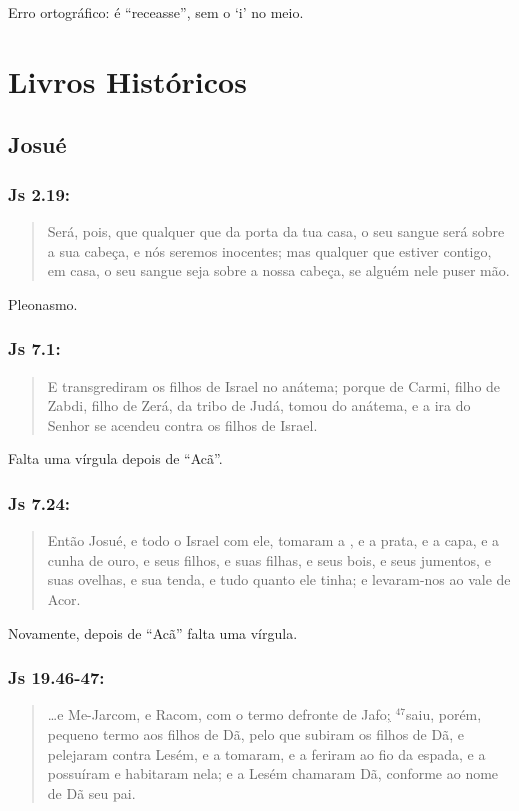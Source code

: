 Erro ortográfico: é ``receasse'', sem o `i' no meio.

\chapter{Livros Históricos}

\section{Josué}
\subsection*{Js 2.19:} 
\begin{quote}
    \small
Será, pois, que qualquer que  da porta da tua casa, o seu sangue será sobre a sua cabeça, e nós seremos inocentes; mas qualquer que estiver contigo, em casa, o seu sangue seja sobre a nossa cabeça, se alguém nele puser mão.
\end{quote}

Pleonasmo.

\subsection*{Js 7.1:} 
\begin{quote}
    \small
E transgrediram os filhos de Israel no anátema; porque  de Carmi, filho de Zabdi, filho de Zerá, da tribo de Judá, tomou do anátema, e a ira do Senhor se acendeu contra os filhos de Israel.
\end{quote}

Falta uma vírgula depois de ``Acã''.

\subsection*{Js 7.24:} 
\begin{quote}
    \small
  Então Josué, e todo o Israel com ele, tomaram a , e a prata, e a capa, e a cunha de ouro, e seus filhos, e suas filhas, e seus bois, e seus jumentos, e suas ovelhas, e sua tenda, e tudo quanto ele tinha; e levaram-nos ao vale de Acor.  
\end{quote}

Novamente, depois de ``Acã'' falta uma vírgula.

\subsection*{Js 19.46-47:} 
\begin{quote}
    \small
\ldots e Me-Jarcom, e Racom, com o termo defronte de Jafo\uline{;} $^{\mathrm{47}}$saiu, porém, pequeno termo aos filhos de Dã, pelo que subiram os filhos de Dã, e pelejaram contra Lesém, e a tomaram, e a feriram ao fio da espada, e a possuíram e habitaram nela; e a Lesém chamaram Dã, conforme ao nome de Dã seu pai.    
\end{quote}

